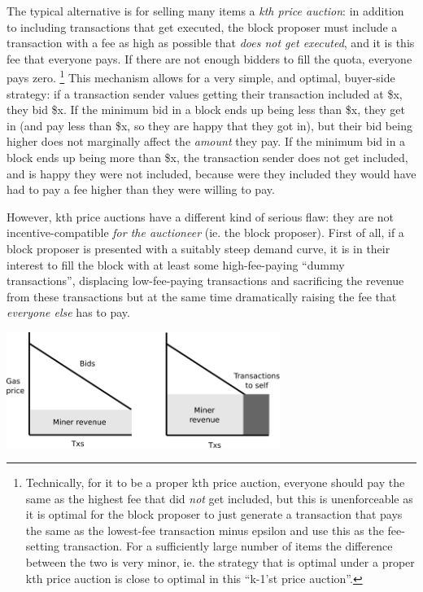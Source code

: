\documentclass[12pt, final]{article}
\begin{document}
The typical alternative is for selling many items a \emph{kth price auction}: in addition to including transactions that get executed, the block proposer must include a transaction with a fee as high as possible that \emph{does not get executed}, and it is this fee that everyone pays. If there are not enough bidders to fill the quota, everyone pays zero. \footnote{Technically, for it to be a proper kth price auction, everyone should pay the same as the highest fee that did \emph{not} get included, but this is unenforceable as it is optimal for the block proposer to just generate a transaction that pays the same as the lowest-fee transaction minus epsilon and use this as the fee-setting transaction. For a sufficiently large number of items the difference between the two is very minor, ie. the strategy that is optimal under a proper kth price auction is close to optimal in this ``k-1'st price auction''.} This mechanism allows for a very simple, and optimal, buyer-side strategy: if a transaction sender values getting their transaction included at \$x, they bid \$x. If the minimum bid in a block ends up being less than \$x, they get in (and pay less than \$x, so they are happy that they got in), but their bid being higher does not marginally affect the \emph{amount} they pay. If the minimum bid in a block ends up being more than \$x, the transaction sender does not get included, and is happy they were not included, because were they included they would have had to pay a fee higher than they were willing to pay.

However, kth price auctions have a different kind of serious flaw: they are not incentive-compatible \emph{for the auctioneer} (ie. the block proposer). First of all, if a block proposer is presented with a suitably steep demand curve, it is in their interest to fill the block with at least some high-fee-paying ``dummy transactions'', displacing low-fee-paying transactions and sacrificing the revenue from these transactions but at the same time dramatically raising the fee that \emph{everyone else} has to pay.

\begin{center}
\includegraphics[width=3.5in]{kth_price_revenue.png} \\
\end{center}
\end{document}
